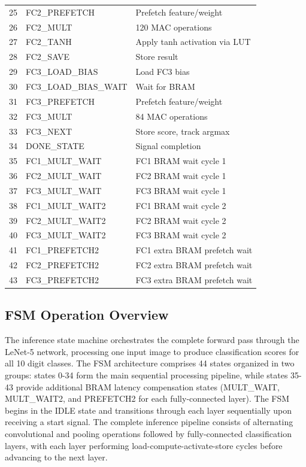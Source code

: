\documentclass[12pt,a4paper]{report}
\begin{document}
\begin{table}[H]
\begin{tabular}{lll}
25 & FC2\_PREFETCH & Prefetch feature/weight \\
26 & FC2\_MULT & 120 MAC operations \\
27 & FC2\_TANH & Apply tanh activation via LUT \\
28 & FC2\_SAVE & Store result \\
29 & FC3\_LOAD\_BIAS & Load FC3 bias \\
30 & FC3\_LOAD\_BIAS\_WAIT & Wait for BRAM \\
31 & FC3\_PREFETCH & Prefetch feature/weight \\
32 & FC3\_MULT & 84 MAC operations \\
33 & FC3\_NEXT & Store score, track argmax \\
34 & DONE\_STATE & Signal completion \\
35 & FC1\_MULT\_WAIT & FC1 BRAM wait cycle 1 \\
36 & FC2\_MULT\_WAIT & FC2 BRAM wait cycle 1 \\
37 & FC3\_MULT\_WAIT & FC3 BRAM wait cycle 1 \\
38 & FC1\_MULT\_WAIT2 & FC1 BRAM wait cycle 2 \\
39 & FC2\_MULT\_WAIT2 & FC2 BRAM wait cycle 2 \\
40 & FC3\_MULT\_WAIT2 & FC3 BRAM wait cycle 2 \\
41 & FC1\_PREFETCH2 & FC1 extra BRAM prefetch wait \\
42 & FC2\_PREFETCH2 & FC2 extra BRAM prefetch wait \\
43 & FC3\_PREFETCH2 & FC3 extra BRAM prefetch wait \\
\bottomrule
\end{tabular}
\end{table}

\subsection{FSM Operation Overview}

The inference state machine orchestrates the complete forward pass through the LeNet-5 network, processing one input image to produce classification scores for all 10 digit classes. The FSM architecture comprises 44 states organized in two groups: states 0-34 form the main sequential processing pipeline, while states 35-43 provide additional BRAM latency compensation states (MULT\_WAIT, MULT\_WAIT2, and PREFETCH2 for each fully-connected layer). The FSM begins in the IDLE state and transitions through each layer sequentially upon receiving a start signal. The complete inference pipeline consists of alternating convolutional and pooling operations followed by fully-connected classification layers, with each layer performing load-compute-activate-store cycles before advancing to the next layer.
\end{document}
